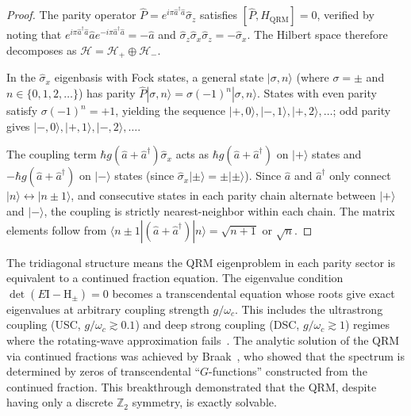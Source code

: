 \documentclass[reprint, floatfix, superscriptaddress, amsmath, amssymb, longbibliography]{revtex4-2}
\begin{document}
\begin{proof}
The parity operator $\hat{P} = e^{i\pi \hat{a}^\dagger\hat{a}}\hat{\sigma}_z$ satisfies $[\hat{P}, \hat{H}_{\mathrm{QRM}}] = 0$, verified by noting that $e^{i\pi \hat{a}^\dagger\hat{a}} \hat{a} e^{-i\pi \hat{a}^\dagger\hat{a}} = -\hat{a}$ and $\hat{\sigma}_z \hat{\sigma}_x \hat{\sigma}_z = -\hat{\sigma}_x$. The Hilbert space therefore decomposes as $\mathcal{H} = \mathcal{H}_+ \oplus \mathcal{H}_-$.

In the $\hat{\sigma}_x$ eigenbasis with Fock states, a general state $|\sigma, n\rangle$ (where $\sigma = \pm$ and $n \in \{0, 1, 2, \ldots\}$) has parity $\hat{P}|\sigma, n\rangle = \sigma(-1)^n |\sigma, n\rangle$. States with even parity satisfy $\sigma(-1)^n = +1$, yielding the sequence $|+,0\rangle, |-,1\rangle, |+,2\rangle, \ldots$; odd parity gives $|-,0\rangle, |+,1\rangle, |-,2\rangle, \ldots$.

The coupling term $\hbar g(\hat{a} + \hat{a}^\dagger)\hat{\sigma}_x$ acts as $\hbar g(\hat{a} + \hat{a}^\dagger)$ on $|+\rangle$ states and $-\hbar g(\hat{a} + \hat{a}^\dagger)$ on $|-\rangle$ states (since $\hat{\sigma}_x|\pm\rangle = \pm|\pm\rangle$). Since $\hat{a}$ and $\hat{a}^\dagger$ only connect $|n\rangle \leftrightarrow |n \pm 1\rangle$, and consecutive states in each parity chain alternate between $|+\rangle$ and $|-\rangle$, the coupling is strictly nearest-neighbor within each chain. The matrix elements follow from $\langle n \pm 1|(\hat{a} + \hat{a}^\dagger)|n\rangle = \sqrt{n+1}$ or $\sqrt{n}$.
\end{proof}

The tridiagonal structure means the QRM eigenproblem in each parity sector is equivalent to a continued fraction equation. The eigenvalue condition $\det(E\mathrm{I} - \mathrm{H}_{\pm}) = 0$ becomes a transcendental equation whose roots give exact eigenvalues at arbitrary coupling strength $g/\omega_c$. This includes the ultrastrong coupling (USC, $g/\omega_c \gtrsim 0.1$) and deep strong coupling (DSC, $g/\omega_c \gtrsim 1$) regimes where the rotating-wave approximation fails~\cite{FornDiaz2019, Kockum2019}. The analytic solution of the QRM via continued fractions was achieved by Braak~\cite{Braak2011}, who showed that the spectrum is determined by zeros of transcendental ``$G$-functions'' constructed from the continued fraction. This breakthrough demonstrated that the QRM, despite having only a discrete $\mathbb{Z}_2$ symmetry, is exactly solvable.

\end{document}
